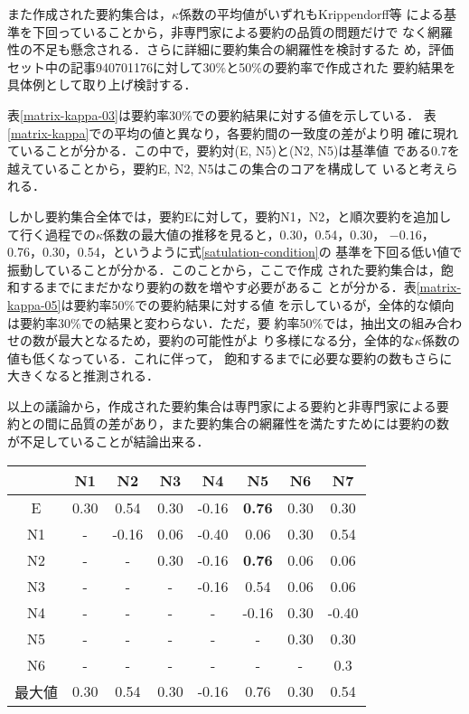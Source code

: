 また作成された要約集合は，$\kappa$係数の平均値がいずれもKrippendorff等
による基準を下回っていることから，非専門家による要約の品質の問題だけで
なく網羅性の不足も懸念される．さらに詳細に要約集合の網羅性を検討するた
め，評価セット中の記事940701176に対して30\%と50\%の要約率で作成された
要約結果を具体例として取り上げ検討する．

表\ref{matrix-kappa-03}は要約率30\%での要約結果に対する値を示している．
表\ref{matrix-kappa}での平均の値と異なり，各要約間の一致度の差がより明
確に現れていることが分かる．この中で，要約対(E, N5)と(N2, N5)は基準値
である0.7を越えていることから，要約E, N2, N5はこの集合のコアを構成して
いると考えられる．

しかし要約集合全体では，要約Eに対して，要約N1，N2，と順次要約を追加し
て行く過程での$\kappa$係数の最大値の推移を見ると，0.30，0.54，0.30，
$-0.16$，0.76，0.30，0.54，というように式\ref{satulation-condition}の
基準を下回る低い値で振動していることが分かる．このことから，ここで作成
された要約集合は，飽和するまでにまだかなり要約の数を増やす必要があるこ
とが分かる．表\ref{matrix-kappa-05}は要約率50\%での要約結果に対する値
を示しているが，全体的な傾向は要約率30\%での結果と変わらない．ただ，要
約率50\%では，抽出文の組み合わせの数が最大となるため，要約の可能性がよ
り多様になる分，全体的な$\kappa$係数の値も低くなっている．これに伴って，
飽和するまでに必要な要約の数もさらに大きくなると推測される．

以上の議論から，作成された要約集合は専門家による要約と非専門家による要
約との間に品質の差があり，また要約集合の網羅性を満たすためには要約の数
が不足していることが結論出来る．

\begin{table*}
\begin{center}
\caption{各要約対の$\kappa$係数の値(評価セット: 940701176，要約率: 30\%)}
{\small
\begin{tabular}{|c||c|c|c|c|c|c|c|} \hline
       & N1 & N2 & N3 & N4 & N5 & N6 & N7 \\ \hline\hline
E&0.30&0.54&0.30&-0.16&{\bf 0.76}&0.30&0.30\\ \hline
N1&-&-0.16&0.06&-0.40&0.06&0.30&0.54\\ \hline
N2&-&-&0.30&-0.16&{\bf 0.76}&0.06&0.06\\ \hline
N3&-&-&-&-0.16&0.54&0.06&0.06\\ \hline
N4&-&-&-&-&-0.16&0.30&-0.40\\ \hline
N5&-&-&-&-&-&0.30&0.30\\ \hline
N6&-&-&-&-&-&-&0.3\\ \hline\hline
最大値 & 0.30 & 0.54 & 0.30 & -0.16 & 0.76 & 0.30 & 0.54 \\ \hline
\end{tabular}
}
\label{matrix-kappa-03}
\end{center}
\end{table*}

